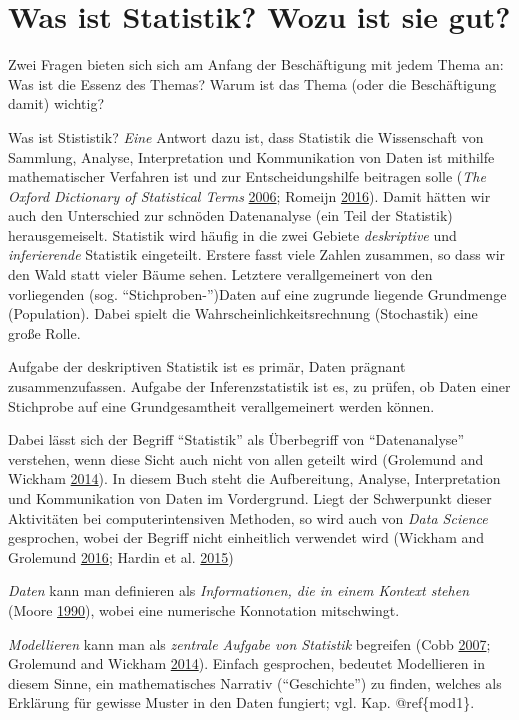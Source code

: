 \documentclass[12pt,]{book}
\begin{document}
\section{Was ist Statistik? Wozu ist sie
gut?}\label{was-ist-statistik-wozu-ist-sie-gut}

Zwei Fragen bieten sich sich am Anfang der Beschäftigung mit jedem Thema
an: Was ist die Essenz des Themas? Warum ist das Thema (oder die
Beschäftigung damit) wichtig?

Was ist Stististik? \emph{Eine} Antwort dazu ist, dass Statistik die
Wissenschaft von Sammlung, Analyse, Interpretation und Kommunikation von
Daten ist mithilfe mathematischer Verfahren ist und zur
Entscheidungshilfe beitragen solle (\emph{The Oxford Dictionary of
Statistical Terms} \protect\hyperlink{ref-oxford}{2006}; Romeijn
\protect\hyperlink{ref-sep-statistics}{2016}). Damit hätten wir auch den
Unterschied zur schnöden Datenanalyse (ein Teil der Statistik)
herausgemeiselt. Statistik wird häufig in die zwei Gebiete
\emph{deskriptive} und \emph{inferierende} Statistik eingeteilt. Erstere
fasst viele Zahlen zusammen, so dass wir den Wald statt vieler Bäume
sehen. Letztere verallgemeinert von den vorliegenden (sog.
``Stichproben-'')Daten auf eine zugrunde liegende Grundmenge
(Population). Dabei spielt die Wahrscheinlichkeitsrechnung (Stochastik)
eine große Rolle.

Aufgabe der deskriptiven Statistik ist es primär, Daten prägnant
zusammenzufassen. Aufgabe der Inferenzstatistik ist es, zu prüfen, ob
Daten einer Stichprobe auf eine Grundgesamtheit verallgemeinert werden
können.

Dabei lässt sich der Begriff ``Statistik'' als Überbegriff von
``Datenanalyse'' verstehen, wenn diese Sicht auch nicht von allen
geteilt wird (Grolemund and Wickham
\protect\hyperlink{ref-grolemund2014cognitive}{2014}). In diesem Buch
steht die Aufbereitung, Analyse, Interpretation und Kommunikation von
Daten im Vordergrund. Liegt der Schwerpunkt dieser Aktivitäten bei
computerintensiven Methoden, so wird auch von \emph{Data Science}
gesprochen, wobei der Begriff nicht einheitlich verwendet wird (Wickham
and Grolemund \protect\hyperlink{ref-r4ds}{2016}; Hardin et al.
\protect\hyperlink{ref-hardin2015data}{2015})

\emph{Daten} kann man definieren als \emph{Informationen, die in einem
Kontext stehen} (Moore
\protect\hyperlink{ref-moore1990uncertainty}{1990}), wobei eine
numerische Konnotation mitschwingt.

\emph{Modellieren} kann man als \emph{zentrale Aufgabe von Statistik}
begreifen (Cobb \protect\hyperlink{ref-cobb2007introductory}{2007};
Grolemund and Wickham
\protect\hyperlink{ref-grolemund2014cognitive}{2014}). Einfach
gesprochen, bedeutet Modellieren in diesem Sinne, ein mathematisches
Narrativ (``Geschichte'') zu finden, welches als Erklärung für gewisse
Muster in den Daten fungiert; vgl. Kap. @ref\{mod1\}.
\end{document}
